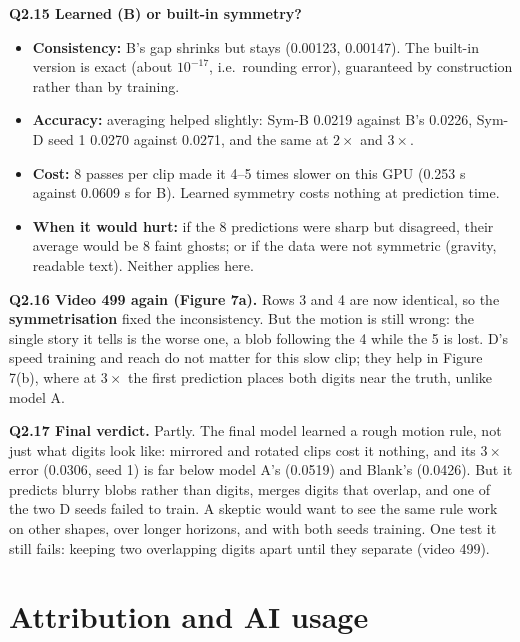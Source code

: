 \documentclass[10pt,a4paper]{article}
\newcommand{\q}[1]{\textbf{#1}}
\begin{document}
\q{Q2.15 Learned (B) or built-in symmetry?}
\begin{itemize}
  \item \textbf{Consistency:} B's gap shrinks but stays (0.00123, 0.00147). The built-in version is exact (about $10^{-17}$, i.e.\ rounding error), guaranteed by construction rather than by training.
  \item \textbf{Accuracy:} averaging helped slightly: Sym-B 0.0219 against B's 0.0226, Sym-D seed 1 0.0270 against 0.0271, and the same at $2\times$ and $3\times$.
  \item \textbf{Cost:} 8 passes per clip made it 4--5 times slower on this GPU (0.253 s against 0.0609 s for B). Learned symmetry costs nothing at prediction time.
  \item \textbf{When it would hurt:} if the 8 predictions were sharp but disagreed, their average would be 8 faint ghosts; or if the data were not symmetric (gravity, readable text). Neither applies here.
\end{itemize}

\q{Q2.16 Video 499 again (Figure 7a).} Rows 3 and 4 are now identical, so the \textbf{symmetrisation} fixed the inconsistency. But the motion is still wrong: the single story it tells is the worse one, a blob following the 4 while the 5 is lost. D's speed training and reach do not matter for this slow clip; they help in Figure 7(b), where at $3\times$ the first prediction places both digits near the truth, unlike model A.

\q{Q2.17 Final verdict.} Partly. The final model learned a rough motion rule, not just what digits look like: mirrored and rotated clips cost it nothing, and its $3\times$ error (0.0306, seed 1) is far below model A's (0.0519) and Blank's (0.0426). But it predicts blurry blobs rather than digits, merges digits that overlap, and one of the two D seeds failed to train. A skeptic would want to see the same rule work on other shapes, over longer horizons, and with both seeds training. One test it still fails: keeping two overlapping digits apart until they separate (video 499).


\section{Attribution and AI usage}
\end{document}
